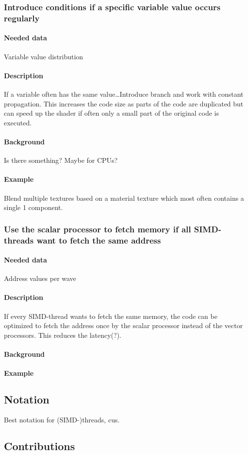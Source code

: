 \subsubsection{Introduce conditions if a specific variable value occurs regularly}
\paragraph{Needed data} Variable value distribution
\paragraph{Description} If a variable often has the same value\dots Introduce branch and work with constant propagation. This increases the code size as parts of the code are duplicated but can speed up the shader if often only a small part of the original code is executed.
\paragraph{Background} Is there something? Maybe for CPUs?
\paragraph{Example} Blend multiple textures based on a material texture which most often contains a single 1 component.
	
\subsubsection{Use the scalar processor to fetch memory if all SIMD-threads want to fetch the same address}
\paragraph{Needed data} Address values per wave
\paragraph{Description} If every SIMD-thread wants to fetch the same memory, the code can be optimized to fetch the address once by the scalar processor instead of the vector processors. This reduces the latency(?).
\paragraph{Background}
\paragraph{Example}

\subsection{Notation}
\label{sub:notation}
Best notation for (SIMD-)threads, \glspl{cu}.

\subsection{Contributions}
\label{sub:contributions}
